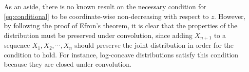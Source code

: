 


As an aside, there is no known result on the necessary condition for \autoref{eq:conditional} to be coordinate-wise
non-decreasing with respect to $z$. However, by following the proof of Efron's theorem, 
it is clear that the properties of the distribution must be preserved under convolution, since adding $X_{n+1}$ to 
a sequence $X_1,X_2,\cdots,X_n$ should preserve the joint distribution in order for the condition to hold.
For instance, log-concave distributions satisfy this condition because they are closed under convolution. 
